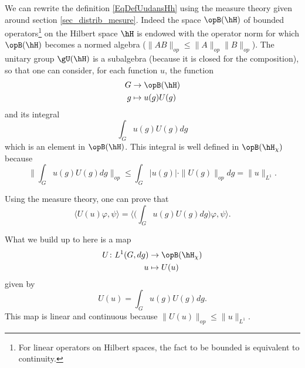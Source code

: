 We can rewrite the definition \eqref{EqDefUudansHh} using the measure theory given around section \ref{sec_distrib_mesure}. Indeed the space $\opB(\hH)$ of bounded operators\footnote{For linear operators on Hilbert spaces, the fact to be bounded is equivalent to continuity.} on the Hilbert space $\hH$ is endowed with the operator norm for which $\opB(\hH)$ becomes a normed algebra ($\| AB \|_{op}\leq\| A \|_{op}\| B \|_{op}$). The unitary group $\gU(\hH)$ is a subalgebra (because it is closed for the composition), so that one can consider, for each function $u$, the function
\begin{equation}
	\begin{aligned}
		G&\to \opB(\hH) \\
		g&\mapsto u(g)U(g) 
	\end{aligned}
\end{equation}
and its integral
\begin{equation}
	\int_G u(g)U(g)dg
\end{equation}
which is an element in $\opB(\hH)$. This integral is well defined in $\opB(\hH_{\chi})$ because
\begin{equation}
	\| \int_G u(g)U(g)dg \|_{op}\leq\int_G | u(g) |\cdot \| U(g) \|_{op}dg=\| u \|_{L^1}.
\end{equation}

Using the measure theory, one can prove that
\begin{equation}
	\langle U(u)\varphi, \psi\rangle =\langle  \big( \int_G u(g)U(g)dg \big)\varphi , \psi\rangle.
\end{equation}

What we build up to here is a map
\begin{equation}
	\begin{aligned}
		U\colon L^1(G,dg)&\to \opB(\hH_{\chi}) \\
		u&\mapsto U(u) 
	\end{aligned}
\end{equation}
given by
\begin{equation}
	U(u)=\int_G u(g)U(g)dg.
\end{equation}
This map is linear and continuous because $\| U(u) \|_{op}\leq\| u \|_{L^1}$.

